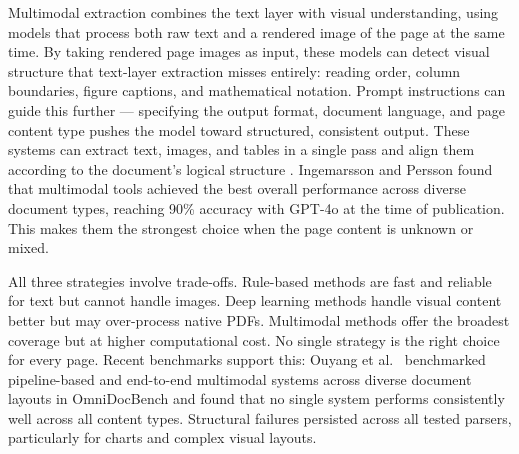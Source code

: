 Multimodal extraction combines the text layer with visual understanding, using
models that process both raw text and a rendered image of the page at the same
time. By taking rendered page images as input, these models can detect visual
structure that text-layer extraction misses entirely: reading order, column
boundaries, figure captions, and mathematical notation. Prompt instructions can
guide this further --- specifying the output format, document language, and page
content type pushes the model toward structured, consistent output. These systems
can extract text, images, and tables in a single pass and align them according to
the document's logical structure \autocite{ingemarsson2024}. Ingemarsson and
Persson \autocite{ingemarsson2024} found that multimodal tools achieved the best
overall performance across diverse document types, reaching 90\% accuracy with
GPT-4o at the time of publication. This makes them the strongest choice when the
page content is unknown or mixed.

All three strategies involve trade-offs. Rule-based methods are fast and
reliable for text but cannot handle images. Deep learning methods handle visual
content better but may over-process native PDFs. Multimodal methods offer the
broadest coverage but at higher computational cost. No single strategy is the
right choice for every page. Recent benchmarks support this: Ouyang et al.\
\autocite{omnidocbench2025} benchmarked pipeline-based and end-to-end multimodal
systems across diverse document layouts in OmniDocBench and found that no single
system performs consistently well across all content types. Structural failures
persisted across all tested parsers, particularly for charts and complex visual
layouts.
